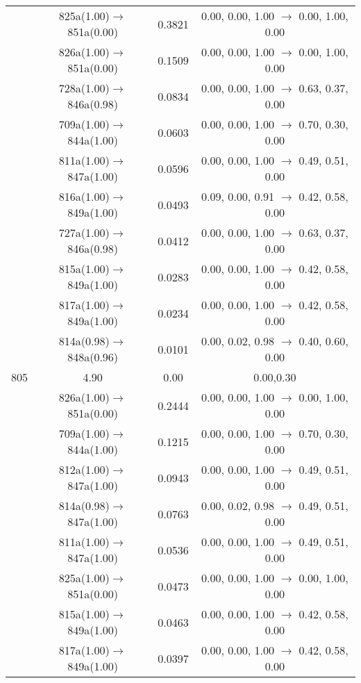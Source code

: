 \documentclass[10pt,a4paper]{article}
\begin{document}
\begin{longtable}{c|c|c|c}
  	& 825a(1.00)$\rightarrow$851a(0.00) &	 0.3821 &	 0.00, 0.00, 1.00 $\rightarrow$ 0.00, 1.00, 0.00 \\ 
 	& 826a(1.00)$\rightarrow$851a(0.00) &	 0.1509 &	 0.00, 0.00, 1.00 $\rightarrow$ 0.00, 1.00, 0.00 \\ 
 	& 728a(1.00)$\rightarrow$846a(0.98) &	 0.0834 &	 0.00, 0.00, 1.00 $\rightarrow$ 0.63, 0.37, 0.00 \\ 
 	& 709a(1.00)$\rightarrow$844a(1.00) &	 0.0603 &	 0.00, 0.00, 1.00 $\rightarrow$ 0.70, 0.30, 0.00 \\ 
 	& 811a(1.00)$\rightarrow$847a(1.00) &	 0.0596 &	 0.00, 0.00, 1.00 $\rightarrow$ 0.49, 0.51, 0.00 \\ 
 	& 816a(1.00)$\rightarrow$849a(1.00) &	 0.0493 &	 0.09, 0.00, 0.91 $\rightarrow$ 0.42, 0.58, 0.00 \\ 
 	& 727a(1.00)$\rightarrow$846a(0.98) &	 0.0412 &	 0.00, 0.00, 1.00 $\rightarrow$ 0.63, 0.37, 0.00 \\ 
 	& 815a(1.00)$\rightarrow$849a(1.00) &	 0.0283 &	 0.00, 0.00, 1.00 $\rightarrow$ 0.42, 0.58, 0.00 \\ 
 	& 817a(1.00)$\rightarrow$849a(1.00) &	 0.0234 &	 0.00, 0.00, 1.00 $\rightarrow$ 0.42, 0.58, 0.00 \\ 
 	& 814a(0.98)$\rightarrow$848a(0.96) &	 0.0101 &	 0.00, 0.02, 0.98 $\rightarrow$ 0.40, 0.60, 0.00 \\ 
 \hline805 &	 4.90 &	 0.00 &	 0.00,0.30 \\ 
  	& 826a(1.00)$\rightarrow$851a(0.00) &	 0.2444 &	 0.00, 0.00, 1.00 $\rightarrow$ 0.00, 1.00, 0.00 \\ 
 	& 709a(1.00)$\rightarrow$844a(1.00) &	 0.1215 &	 0.00, 0.00, 1.00 $\rightarrow$ 0.70, 0.30, 0.00 \\ 
 	& 812a(1.00)$\rightarrow$847a(1.00) &	 0.0943 &	 0.00, 0.00, 1.00 $\rightarrow$ 0.49, 0.51, 0.00 \\ 
 	& 814a(0.98)$\rightarrow$847a(1.00) &	 0.0763 &	 0.00, 0.02, 0.98 $\rightarrow$ 0.49, 0.51, 0.00 \\ 
 	& 811a(1.00)$\rightarrow$847a(1.00) &	 0.0536 &	 0.00, 0.00, 1.00 $\rightarrow$ 0.49, 0.51, 0.00 \\ 
 	& 825a(1.00)$\rightarrow$851a(0.00) &	 0.0473 &	 0.00, 0.00, 1.00 $\rightarrow$ 0.00, 1.00, 0.00 \\ 
 	& 815a(1.00)$\rightarrow$849a(1.00) &	 0.0463 &	 0.00, 0.00, 1.00 $\rightarrow$ 0.42, 0.58, 0.00 \\ 
 	& 817a(1.00)$\rightarrow$849a(1.00) &	 0.0397 &	 0.00, 0.00, 1.00 $\rightarrow$ 0.42, 0.58, 0.00 \\ 

\end{longtable}
\end{document}
